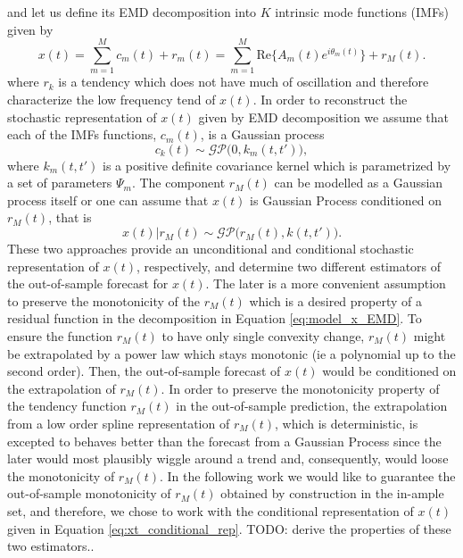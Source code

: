and let us define its EMD decomposition into $K$ intrinsic mode functions (IMFs) given by 
\begin{equation}\label{eq:model_x_EMD}
x(t) = \sum_{m = 1}^M c_m(t) + r_m(t) = \sum_{m = 1}^M \text{Re}\Big\{ A_m(t)  e^{i \theta_m(t)} \Big\} + r_M(t).
\end{equation}
where $r_k$ is a tendency which does not have much of oscillation and therefore characterize the low frequency tend of $x(t)$. In order to reconstruct the stochastic representation of $x(t)$ given by EMD decomposition we assume that each of the IMFs functions, $c_m(t)$, is a Gaussian process 
\begin{equation}\label{eq:model_IMF_GP_k}
c_k(t) \sim \mathcal{GP} \Big(0, k_m(t,t')\Big), 
\end{equation}
where $k_m(t,t')$ is a positive definite covariance kernel which is parametrized by a set of parameters $\Psi_m$.   The component $r_M(t)$ can be modelled as a Gaussian process itself or one can assume that $x(t)$ is Gaussian Process conditioned on $r_M(t)$, that is
\begin{equation}\label{eq:xt_conditional_rep}
x(t) | r_M(t) \sim \mathcal{GP} \Big(r_M(t),  k(t,t')  \Big).
\end{equation}
These two approaches provide an unconditional and conditional stochastic representation of $x(t)$, respectively, and determine two different estimators of the out-of-sample forecast for $x(t)$.  The later is a more convenient assumption to preserve the monotonicity of the $r_M(t)$ which is a desired property of a residual function in the decomposition in Equation \eqref{eq:model_x_EMD}.  To ensure the function $r_M(t)$ to have only single convexity change, $r_M(t)$ might be extrapolated by a power law which stays monotonic (ie a polynomial up to the second order). Then, the out-of-sample forecast of $x(t)$ would be conditioned on the extrapolation of $r_M(t)$.  In order to preserve the monotonicity property of the tendency function $r_M(t)$ in the out-of-sample prediction, the extrapolation from a low order spline representation of $r_M(t)$, which is deterministic,  is excepted to behaves better than the forecast from a Gaussian Process since the later would most plausibly wiggle around a trend and, consequently, would loose the monotonicity of $r_M(t)$.  In the following work we would like to guarantee the out-of-sample monotonicity of $r_M(t)$ obtained by construction in the in-ample set,  and therefore, we chose to work with the conditional representation of $x(t)$ given in Equation \eqref{eq:xt_conditional_rep}.  {\color{red} TODO: derive the properties of these two estimators.}.


